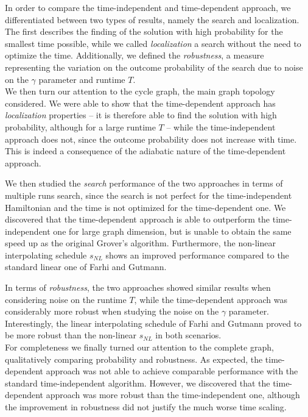 \documentclass[11pt, twoside]{report}
\begin{document}
\noindent
In order to compare the time-independent and time-dependent approach, we differentiated between two types of results, namely the search and localization. The first describes the finding of the solution with high probability for the smallest time possible, while we called \textit{localization} a search without the need to optimize the time. Additionally, we defined the \textit{robustness}, a measure representing the variation on the outcome probability of the search due to noise on the $\gamma$ parameter and runtime $T$. \\

We then turn our attention to the cycle graph, the main graph topology considered. We were able to show that the time-dependent approach has \textit{localization} properties -- it is therefore able to find the solution with high probability, although for a large runtime $T$ -- while the time-independent approach does not, since the outcome probability does not increase with time. This is indeed a consequence of the adiabatic nature of the time-dependent approach.  

We then studied the \textit{search} performance of the two approaches in terms of multiple runs search, since the search is not perfect for the time-independent Hamiltonian and the time is not optimized for the time-dependent one. We discovered that the time-dependent approach is able to outperform the time-independent one for large graph dimension, but is unable to obtain the same speed up as the original Grover's algorithm. Furthermore, the non-linear interpolating schedule $s_{NL}$ shows an improved performance compared to the standard linear one of Farhi and Gutmann. 

In terms of \textit{robustness}, the two approaches showed similar results when considering noise on the runtime $T$, while the time-dependent approach was considerably more robust when studying the noise on the $\gamma$ parameter. Interestingly, the linear interpolating schedule of Farhi and Gutmann proved to be more robust than the non-linear $s_{NL}$ in both scenarios. \\

For completeness we finally turned our attention to the complete graph, qualitatively comparing probability and robustness. As expected, the time-dependent approach was not able to achieve comparable performance with the standard time-independent algorithm. However, we discovered that the time-dependent approach was more robust than the time-independent one, although the improvement in robustness did not justify the much worse time scaling. \\
\end{document}
